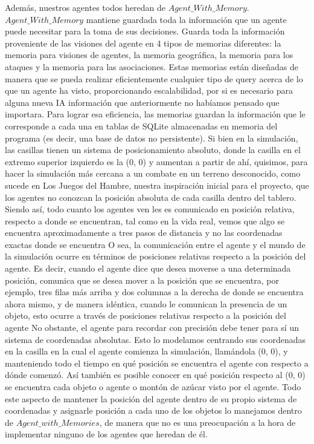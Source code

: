 \documentclass[11pt]{article}
\begin{document}
Además, nuestros agentes todos heredan de $Agent\_With\_Memory$. $Agent\_With\_Memory$ mantiene guardada toda la información que un agente puede necesitar para la toma de sus decisiones. Guarda toda la información proveniente de las visiones del agente en 4 tipos de memorias diferentes: la memoria para visiones de agentes, la memoria geográfica, la memoria para los ataques y la memoria para las asociaciones. Estas memorias están diseñadas de manera que se pueda realizar eficientemente cualquier tipo de query acerca de lo que un agente ha visto, proporcionando escalabilidad, por si es necesario para alguna nueva IA información que anteriormente no habíamos pensado que importara. Para lograr esa eficiencia, las memorias guardan la información que le corresponde a cada una en tablas de SQLite almacenadas en memoria del programa (es decir, una base de datos no persistente).
Si bien en la simulación, las casillas tienen un sistema de posicionamiento absoluto, donde la casilla en el extremo superior izquierdo es la (0, 0) y aumentan a partir de ahí, quisimos, para hacer la simulación más cercana a un combate en un terreno desconocido, como sucede en Los Juegos del Hambre, nuestra inspiración inicial para el proyecto, que los agentes no conozcan la posición absoluta de cada casilla dentro del tablero. Siendo así, todo cuanto los agentes ven les es comunicado en posición relativa, respecto a donde se encuentran, tal como en la vida real, vemos que algo se encuentra aproximadamente a tres pasos de distancia y no las coordenadas exactas donde se encuentra
O sea, la comunicación entre el agente y el mundo de la simulación ocurre en términos de posiciones relativas respecto a la posición del agente. Es decir, cuando el agente dice que desea moverse a una determinada posición, comunica que se desea mover a la posición que se encuentra, por ejemplo, tres filas más arriba y dos columnas a la derecha de donde se encuentra ahora mismo, y de manera idéntica, cuando le comunican la presencia de un objeto, esto ocurre a través de posiciones relativas respecto a la posición del agente
No obstante, el agente para recordar con precisión debe tener para sí un sistema de coordenadas absolutas. Esto lo modelamos centrando sus coordenadas en la casilla en la cual el agente comienza la simulación, llamándola (0, 0), y manteniendo todo el tiempo en qué posición se encuentra el agente con respecto a dónde comenzó. Así también es posible conocer en qué posición respecto al (0, 0) se encuentra cada objeto o agente o montón de azúcar visto por el agente. Todo este aspecto de mantener la posición del agente dentro de su propio sistema de coordenadas y asignarle posición a cada uno de los objetos lo manejamos dentro de $Agent\_with\_Memories$, de manera que no es una preocupación a la hora de implementar ninguno de los agentes que heredan de él.
\end{document}
